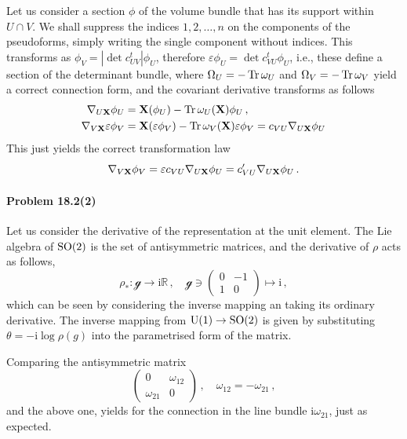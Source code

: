 \documentclass[a4paper,12pt]{article}
\def\imagi{\mathrm{i}}
\def\Tr{\ensuremath{\mathop{\rm Tr}}}
\newcommand{\problem}[1]{\paragraph{Problem #1}}
\begin{document}
Let us consider a section $\phi$ of the volume bundle that has its support within $U\cap V$. We shall suppress the indices $1,2,\dots, n$ on the components of the pseudoforms, simply writing the single component without indices. This transforms as $\phi_V = |\det c_{UV}^t| \phi_U $, therefore $\varepsilon \phi_U = \det c_{VU}^t \phi_U$, i.e., these define a section of the determinant bundle, where $\Omega_U = -\Tr\omega_U$ and $\Omega_V = -\Tr \omega_V$ yield a correct connection form, and the covariant derivative transforms as follows
\[
\begin{aligned}
 \nabla_{U\bf X} \phi_U &= {\bf X}(\phi_U) - \Tr\omega_U({\bf X}) \phi_U\,,\\
 \nabla_{V\bf X}\varepsilon\phi_V  &= {\bf X}(\varepsilon \phi_V) -\Tr\omega_V({\bf X})\varepsilon\phi_V = c_{VU}\nabla_{U\bf X}\phi_U
\end{aligned}
\]
This just yields the correct transformation law
\[
 \nabla_{V\bf X}\phi_V = \varepsilon c_{VU} \nabla_{U\bf X}\phi_U = c'_{VU} \nabla_{U\bf X}\phi_U\,.
\]


\problem{18.2(2)} Let us consider the derivative of the representation at the unit element. The Lie algebra of ${\rm SO}(2)$ is the set of antisymmetric matrices, and the derivative of $\rho$ acts as follows,
\[
 \rho_*: \mathcal{g}\to \imagi \mathbb{R}\,,\quad
 \mathcal{g} \ni \begin{pmatrix} 0 & -1 \\ 1 & 0 \end{pmatrix} \mapsto \imagi\,,
\]
which can be seen by considering the inverse mapping an taking its ordinary derivative. The inverse mapping from ${\rm U}(1) \to {\rm SO}(2)$ is given by substituting $\theta = -\imagi \log \rho(g)$ into the parametrised form of the matrix.

Comparing the antisymmetric matrix
\[
 \begin{pmatrix} 0 & \omega_{12} \\ \omega_{21} & 0 \end{pmatrix}\,,\quad \omega_{12}=-\omega_{21}\,,
\]
and the above one, yields for the connection in the line bundle $\imagi \omega_{21}$, just as expected.

\end{document}
